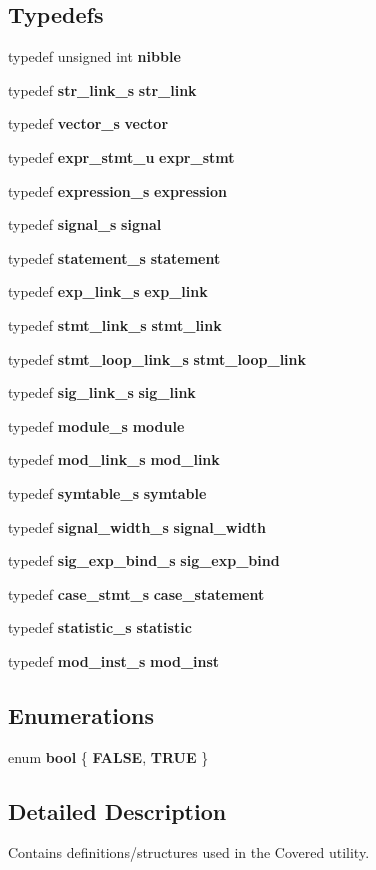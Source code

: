 \subsection*{Typedefs}
\begin{CompactItemize}
\item 
typedef unsigned int {\bf nibble}
\item 
typedef {\bf str\_\-link\_\-s} {\bf str\_\-link}
\item 
typedef {\bf vector\_\-s} {\bf vector}
\item 
typedef {\bf expr\_\-stmt\_\-u} {\bf expr\_\-stmt}
\item 
typedef {\bf expression\_\-s} {\bf expression}
\item 
typedef {\bf signal\_\-s} {\bf signal}
\item 
typedef {\bf statement\_\-s} {\bf statement}
\item 
typedef {\bf exp\_\-link\_\-s} {\bf exp\_\-link}
\item 
typedef {\bf stmt\_\-link\_\-s} {\bf stmt\_\-link}
\item 
typedef {\bf stmt\_\-loop\_\-link\_\-s} {\bf stmt\_\-loop\_\-link}
\item 
typedef {\bf sig\_\-link\_\-s} {\bf sig\_\-link}
\item 
typedef {\bf module\_\-s} {\bf module}
\item 
typedef {\bf mod\_\-link\_\-s} {\bf mod\_\-link}
\item 
typedef {\bf symtable\_\-s} {\bf symtable}
\item 
typedef {\bf signal\_\-width\_\-s} {\bf signal\_\-width}
\item 
typedef {\bf sig\_\-exp\_\-bind\_\-s} {\bf sig\_\-exp\_\-bind}
\item 
typedef {\bf case\_\-stmt\_\-s} {\bf case\_\-statement}
\item 
typedef {\bf statistic\_\-s} {\bf statistic}
\item 
typedef {\bf mod\_\-inst\_\-s} {\bf mod\_\-inst}
\end{CompactItemize}
\subsection*{Enumerations}
\begin{CompactItemize}
\item 
enum {\bf bool} \{ {\bf FALSE}, 
{\bf TRUE}
 \}
\end{CompactItemize}


\subsection{Detailed Description}
Contains definitions/structures used in the Covered utility.



